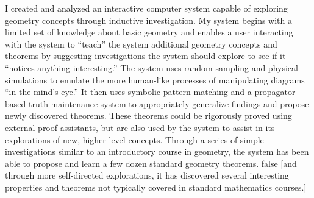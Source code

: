 %
%
%
I created and analyzed an interactive computer system capable of
exploring geometry concepts through inductive investigation.  My
system begins with a limited set of knowledge about basic geometry and
enables a user interacting with the system to ``teach'' the system
additional geometry concepts and theorems by suggesting investigations
the system should explore to see if it ``notices anything
interesting.''  The system uses random sampling and physical
simulations to emulate the more human-like processes of manipulating
diagrams ``in the mind's eye.'' It then uses symbolic pattern matching
and a propagator-based truth maintenance system to appropriately
generalize findings and propose newly discovered theorems. These
theorems could be rigorously proved using external proof assistants,
but are also used by the system to assist in its explorations of new,
higher-level concepts. Through a series of simple investigations
similar to an introductory course in geometry, the system has been
able to propose and learn a few dozen standard geometry theorems.
\if false
[and
  through more self-directed explorations, it has discovered several
  interesting properties and theorems not typically covered in
  standard mathematics courses.]
\fi
